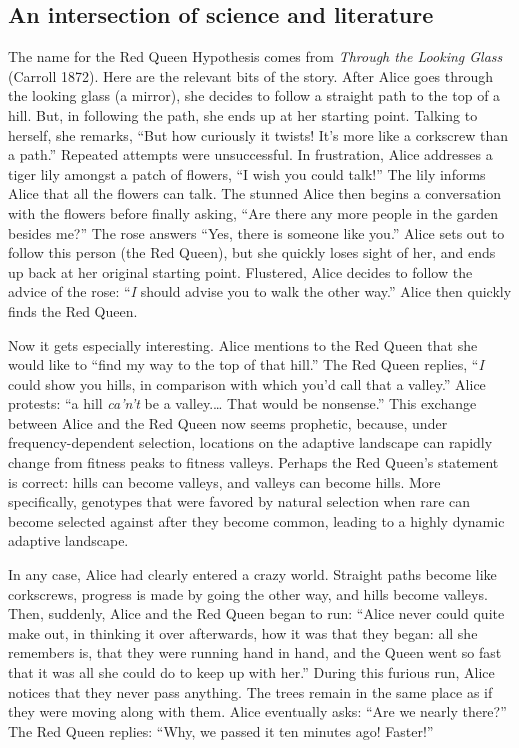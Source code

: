 \documentclass[
  letterpaper,
]{book}
\begin{document}
\subsection{An intersection of science and
literature}\label{an-intersection-of-science-and-literature}

The name for the Red Queen Hypothesis comes from \emph{Through the
Looking Glass} (Carroll 1872). Here are the relevant bits of the story.
After Alice goes through the looking glass (a mirror), she decides to
follow a straight path to the top of a hill. But, in following the path,
she ends up at her starting point. Talking to herself, she remarks,
``But how curiously it twists! It's more like a corkscrew than a path.''
Repeated attempts were unsuccessful. In frustration, Alice addresses a
tiger lily amongst a patch of flowers, ``I wish you could talk!'' The
lily informs Alice that all the flowers can talk. The stunned Alice then
begins a conversation with the flowers before finally asking, ``Are
there any more people in the garden besides me?'' The rose answers
``Yes, there is someone like you.'' Alice sets out to follow this person
(the Red Queen), but she quickly loses sight of her, and ends up back at
her original starting point. Flustered, Alice decides to follow the
advice of the rose: ``\emph{I} should advise you to walk the other
way.'' Alice then quickly finds the Red Queen.

Now it gets especially interesting. Alice mentions to the Red Queen that
she would like to ``find my way to the top of that hill.'' The Red Queen
replies, ``\emph{I} could show you hills, in comparison with which you'd
call that a valley.'' Alice protests: ``a hill \emph{ca'n't} be a
valley.\ldots{} That would be nonsense.'' This exchange between Alice
and the Red Queen now seems prophetic, because, under
frequency-dependent selection, locations on the adaptive landscape can
rapidly change from fitness peaks to fitness valleys. Perhaps the Red
Queen's statement is correct: hills can become valleys, and valleys can
become hills. More specifically, genotypes that were favored by natural
selection when rare can become selected against after they become
common, leading to a highly dynamic adaptive landscape.

In any case, Alice had clearly entered a crazy world. Straight paths
become like corkscrews, progress is made by going the other way, and
hills become valleys. Then, suddenly, Alice and the Red Queen began to
run: ``Alice never could quite make out, in thinking it over afterwards,
how it was that they began: all she remembers is, that they were running
hand in hand, and the Queen went so fast that it was all she could do to
keep up with her.'' During this furious run, Alice notices that they
never pass anything. The trees remain in the same place as if they were
moving along with them. Alice eventually asks: ``Are we nearly there?''
The Red Queen replies: ``Why, we passed it ten minutes ago! Faster!''
\end{document}
